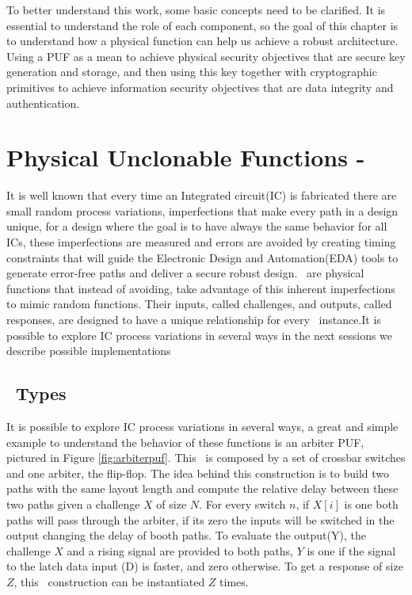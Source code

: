 
To better understand this work, some basic concepts need to be clarified. It is essential to understand the role of each component, so the goal of this chapter is to understand how a physical function can help us achieve a robust architecture. Using a PUF as a mean to achieve physical security objectives that are secure key generation and storage,  and then using this key together with cryptographic primitives to achieve information security objectives that are data integrity and authentication. 



\section{Physical Unclonable Functions - \pufs~}
\label{sec:pufs}
It is well known that every time an Integrated circuit(IC) is fabricated there are small random process variations, imperfections that make every path in a design unique, for a design where the goal is to have always the same behavior for all ICs, these imperfections are measured and errors are avoided by creating timing constraints that will guide the Electronic Design and Automation(EDA) tools to  generate error-free paths and deliver a \rm{secure} robust design. \pufs~are physical functions that instead of avoiding, take advantage of this inherent imperfections to mimic random functions. Their inputs, called challenges, and outputs, called responses, are designed to have a unique relationship for every \puf~instance.It is possible to explore IC process variations in several ways\cite{DBLP:phdbasesearchMaes12} in the next sessions we describe  possible implementations%

\subsection{\puf~Types}
It is possible to explore IC process variations in several ways, a great and simple example to understand the behavior of these functions is an arbiter PUF, pictured in Figure \ref{fig:arbiterpuf}.
This \puf~is composed by a set of crossbar switches and one arbiter, the flip-flop. The idea behind this construction is to build two paths with the same layout length and compute the relative delay between these two paths given a challenge $X$ of size $N$.  For every switch $n$, if $X[i]$  is one both paths will pass through the arbiter, if its zero the inputs will be switched in the output changing the delay of booth paths. To evaluate the output(Y), the challenge $X$ and a rising signal are provided to both paths, $Y$ is one if the signal to the latch data input (D) is faster, and zero otherwise. To get a response of size $Z$, this \puf~construction  can be instantiated $Z$ times.


